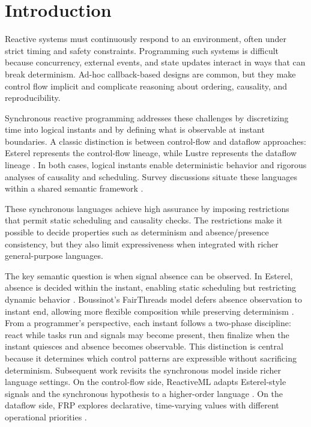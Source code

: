 \section{Introduction}
Reactive systems must continuously respond to an environment, often under
strict timing and safety constraints. Programming such systems is difficult
because concurrency, external events, and state updates interact in ways that
can break determinism. Ad-hoc callback-based designs are common, but they make
control flow implicit and complicate reasoning about ordering, causality, and
reproducibility.

Synchronous reactive programming addresses these challenges by discretizing
time into logical instants and by defining what is observable at instant
boundaries. A classic distinction is between control-flow and dataflow
approaches: Esterel represents the control-flow lineage, while Lustre
represents the dataflow lineage \cite{esterel1992,lustre1991}. In both cases,
logical instants enable deterministic behavior and rigorous analyses of
causality and scheduling. Survey discussions situate these languages within a
shared semantic framework \cite{benveniste2003}.

These synchronous languages achieve high assurance by imposing restrictions
that permit static scheduling and causality checks. The restrictions make it
possible to decide properties such as determinism and absence/presence
consistency, but they also limit expressiveness when integrated with richer
general-purpose languages.

The key semantic question is when signal absence can be observed. In Esterel,
absence is decided within the instant, enabling static scheduling but
restricting dynamic behavior \cite{esterel1992}. Boussinot's FairThreads model
defers absence observation to instant end, allowing more flexible composition
while preserving determinism \cite{fairthreads2003}. From a programmer's
perspective, each instant follows a two-phase discipline: react while tasks run
and signals may become present, then finalize when the instant quiesces and
absence becomes observable.
This distinction is central because it determines which control patterns are
expressible without sacrificing determinism.
Subsequent work revisits the synchronous model inside richer language settings.
On the control-flow side, ReactiveML adapts Esterel-style signals and the
synchronous hypothesis to a higher-order language \cite{reactiveml2005}. On the
dataflow side, FRP explores declarative, time-varying values with different
operational priorities \cite{frp1997}. 

